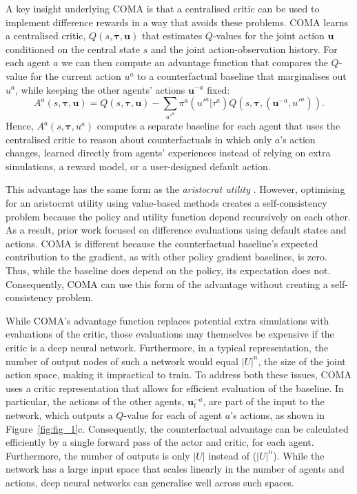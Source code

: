 \documentclass[letterpaper]{article}
\newcommand{\citep}{\cite}
\newcommand{\myvec}[1]{\mathbf{#1}}
\newcommand{\myvecsym}[1]{\boldsymbol{#1}}
\newcommand{\vtau}{\myvecsym{\tau}}
\newcommand{\vu}{\myvec{u}}
\begin{document}
A key insight underlying COMA is that a centralised critic can be used to 
implement difference rewards in a way that avoids these problems.  COMA learns 
a centralised critic, $Q(s, \vtau, \vu)$ that estimates $Q$-values for the joint 
action $\vu$ conditioned on the central state $s$ and the joint action-observation history. For each agent $a$ we can 
then compute an advantage function that compares the $Q$-value for the current 
action $u^a$ to a counterfactual baseline that marginalises out $u^a$, while 
keeping the other agents' actions $\vu^{-a}$ fixed:
\begin{equation}
	\label{eqn:advantage}
	A^a(s, \vtau, \vu) = Q(s, \vtau, \vu ) - \sum_{u'^a} \pi^a(u'^a \vert \tau^a) 
	Q(s, \vtau, (\vu^{-a},u'^a)).
\end{equation}
Hence, $A^a(s, \vtau, u^a)$ computes a separate baseline for each agent that uses the 
centralised critic to reason about counterfactuals in which only $a$'s action 
changes, learned directly from agents' experiences instead of relying on extra 
simulations, a reward model, or a user-designed default action.

This advantage has the same form as the \emph{aristocrat utility} 
\citep{wolpert2002optimal}. However, optimising for an aristocrat utility using 
value-based methods creates a self-consistency problem because the policy and utility 
function depend recursively on each other. As a result, prior work focused
on difference evaluations using default states and actions. COMA is different because the
 counterfactual baseline's expected contribution to the gradient, as with other policy gradient baselines, is zero.  Thus, while
the baseline does depend on the policy, its expectation does not. Consequently, COMA can use 
this form of the advantage without creating a self-consistency problem.

While COMA's advantage function replaces potential extra simulations with 
evaluations of the critic, those evaluations may themselves be expensive if the 
critic is a deep neural network.  Furthermore, in a typical representation, the 
number of output nodes of such a network would equal $\vert U \vert ^ n$, the 
size of the joint action space, making it impractical to train.  To address 
both these issues, COMA uses a critic representation that allows for efficient 
evaluation of the baseline. In particular, the actions of the other agents, 
$\vu^{-a}_t$, are part of the input to the network, which outputs a $Q$-value 
for each of agent $a$'s actions, as shown in Figure~\ref{fig:fig_1}c. 
Consequently, the counterfactual advantage can be calculated efficiently by a 
single forward pass of the actor and critic, for each agent. Furthermore, the 
number of outputs is only $\vert U \vert$ instead of ($\vert U \vert ^ n$). 
While the network has a large input space that scales linearly in the number of 
agents and actions, deep neural networks can generalise well across such spaces.
\end{document}
